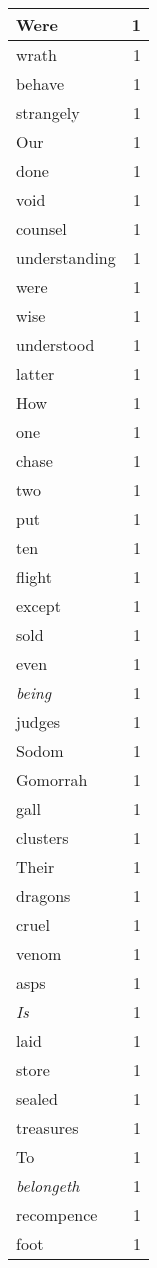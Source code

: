 \begin{center}
\begin{longtable}{l|r}
Were & 1 \\ \hline
wrath & 1 \\ \hline
behave & 1 \\ \hline
strangely & 1 \\ \hline
Our & 1 \\ \hline
done & 1 \\ \hline
void & 1 \\ \hline
counsel & 1 \\ \hline
understanding & 1 \\ \hline
were & 1 \\ \hline
wise & 1 \\ \hline
understood & 1 \\ \hline
latter & 1 \\ \hline
How & 1 \\ \hline
one & 1 \\ \hline
chase & 1 \\ \hline
two & 1 \\ \hline
put & 1 \\ \hline
ten & 1 \\ \hline
flight & 1 \\ \hline
except & 1 \\ \hline
sold & 1 \\ \hline
even & 1 \\ \hline
\emph{being} & 1 \\ \hline
judges & 1 \\ \hline
Sodom & 1 \\ \hline
Gomorrah & 1 \\ \hline
gall & 1 \\ \hline
clusters & 1 \\ \hline
Their & 1 \\ \hline
dragons & 1 \\ \hline
cruel & 1 \\ \hline
venom & 1 \\ \hline
asps & 1 \\ \hline
\emph{Is} & 1 \\ \hline
laid & 1 \\ \hline
store & 1 \\ \hline
sealed & 1 \\ \hline
treasures & 1 \\ \hline
To & 1 \\ \hline
\emph{belongeth} & 1 \\ \hline
recompence & 1 \\ \hline
foot & 1 \\ \hline

\end{longtable}
\end{center}
